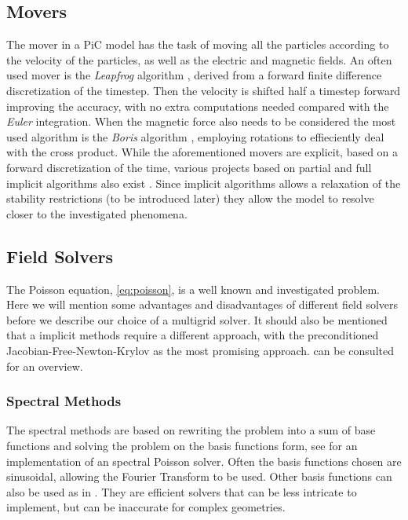 	\subsection{Movers}
		The mover in a PiC model has the task of moving all the particles according to
		the velocity of the particles, as well as the electric and magnetic fields.
		An often used mover is the \textit{Leapfrog} algorithm \citep{birdsall_plasma_2004},
 		derived from a forward finite difference discretization of the timestep. Then the
 		velocity is shifted half a timestep forward improving the accuracy, with no extra computations needed compared
		with the \textit{Euler} integration. When the magnetic force also needs to be considered
		the most used algorithm is the  \textit{Boris} algorithm \citep{qin_why_2013}, employing rotations to effieciently deal with
		the cross product.
		While the aforementioned movers are explicit, based on a forward discretization of the time,
 		various projects based on partial and full implicit algorithms also exist \citep{friedman_direct_1981,lapenta_particle_????}.
		Since implicit algorithms allows a relaxation of the stability restrictions (to be introduced later) they allow
		the model to resolve closer to the investigated phenomena.


    \subsection{Field Solvers}
	\label{sec:solvers}
    The Poisson equation, \cref{eq:poisson}, is a well known and investigated problem.
    Here we will mention some advantages and disadvantages of different
    field solvers before we describe our choice of a multigrid solver. It should also
	be mentioned that a implicit methods require a different approach, with the preconditioned Jacobian-Free-Newton-Krylov as the most promising approach.
	\citet{lapenta_particle_2012} can be consulted for an overview.

    \subsubsection{Spectral Methods}
    	The spectral methods are based on rewriting the problem into a sum of base functions
		and solving the problem on the basis functions form, see \citet{israeli_accurate_2005} for an
    	implementation of an spectral Poisson solver. Often the basis functions chosen are
 		sinusoidal, allowing the Fourier Transform to be used. Other basis functions can also be used as in
		\citet{shen_efficient_1994}. They are efficient solvers that
    	can be less intricate to implement, but can be inaccurate for complex geometries.

